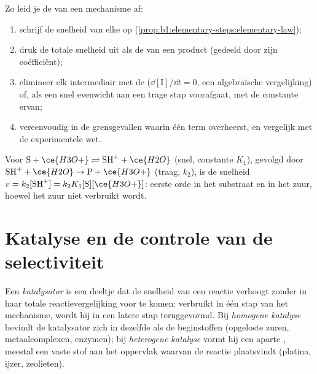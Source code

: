 \begin{method}\label{met:b1:elementary-steps:rate-law}
Zo leid je de  van een mechanisme af:
\begin{enumerate}
  \item schrijf de snelheid van elke  op (\cref{prop:b1:elementary-steps:elementary-law});
  \item druk de totale snelheid uit als de  van een
        product (gedeeld door zijn coëfficiënt);
  \item elimineer elk intermediair met de 
        ($\dd[\mathrm{I}]/\dd t = 0$, een algebraïsche vergelijking) of,
        als een snel evenwicht aan een trage stap voorafgaat, met de
        constante ervan;
  \item vereenvoudig in de grensgevallen waarin één term overheerst, en
        vergelijk met de experimentele wet.
\end{enumerate}
\end{method}

\begin{example}\label{ex:b1:elementary-steps:acid}
Voor $\mathrm{S} + \ce{H3O+} \rightleftharpoons \mathrm{SH}^+ + \ce{H2O}$
(snel, constante $K_1$), gevolgd door
$\mathrm{SH}^+ + \ce{H2O} \to \mathrm{P} + \ce{H3O+}$ (traag,
$k_2$), is de snelheid $v = k_2[\mathrm{SH}^+] = k_2K_1[\mathrm{S}][\ce{H3O+}]$:
eerste orde in het substraat en in het zuur, hoewel het zuur niet
verbruikt wordt.
\end{example}

\section{Katalyse en de controle van de selectiviteit}

\begin{definition}\label{def:b1:elementary-steps:catalyst}
Een \emph{katalysator} is een deeltje dat de snelheid
van een reactie verhoogt zonder in haar totale reactievergelijking voor
te komen: verbruikt in één stap van het mechanisme, wordt hij in een
latere stap teruggevormd. Bij \emph{homogene katalyse}
bevindt de katalysator zich in dezelfde  als de beginstoffen
(opgeloste zuren, metaalcomplexen, enzymen); bij \emph{heterogene
katalyse} vormt hij een aparte , meestal
een vaste stof aan het oppervlak waarvan de reactie plaatsvindt
(platina, ijzer, zeolieten).
\end{definition}

